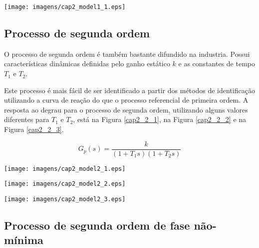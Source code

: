     \begin{center}
        \texttt{[image: imagens/cap2\_model1\_1.eps]}
    \label{cap2_1}
    \end{center}

\subsection{Processo de segunda ordem}
    
    O processo de segunda ordem é também bastante difundido na industria. Possui
    características dinâmicas definidas pelo ganho estático $k$ e as constantes de
    tempo $T_1$ e $T_2$.
    
    Este processo é mais fácil de ser identificado a partir dos métodos de
    identificação utilizando a curva de reação do que o processo referencial de
    primeira ordem. A resposta ao degrau para o processo de segunda ordem, utilizando
    alguns valores diferentes para $T_1$ e $T_2$, está na Figura \ref{cap2_2_1}, na Figura
    \ref{cap2_2_2} e na Figura \ref{cap2_2_3}.
    
    \begin{equation}
        G_p(s) = \frac{k}{(1+T_1 s)(1+T_2 s)}
    \end{equation}
    
    \begin{center}
        \texttt{[image: imagens/cap2\_model2\_1.eps]}
        \label{cap2_2_1}
    \end{center}

    \begin{center}
        \texttt{[image: imagens/cap2\_model2\_2.eps]}
        \label{cap2_2_2}
    \end{center}
    
    \begin{center}
        \texttt{[image: imagens/cap2\_model2\_3.eps]}
        \label{cap2_2_3}
    \end{center}

\subsection{Processo de segunda ordem de fase não-mínima}

